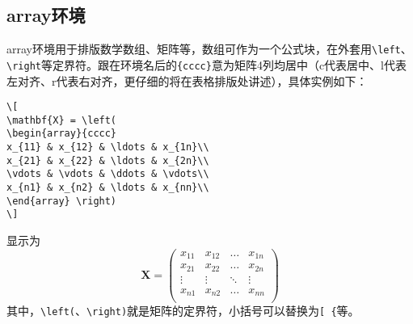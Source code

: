 \subsection{array环境}
array环境用于排版数学数组、矩阵等，数组可作为一个公式块，在外套用\verb|\left|、\verb|\right|等定界符。跟在环境名后的\verb|{cccc}|意为矩阵4列均居中（c代表居中、l代表左对齐、r代表右对齐，更仔细的将在表格排版处讲述），具体实例如下：
\begin{verbatim}
\[ 
\mathbf{X} = \left(
\begin{array}{cccc}
x_{11} & x_{12} & \ldots & x_{1n}\\
x_{21} & x_{22} & \ldots & x_{2n}\\
\vdots & \vdots & \ddots & \vdots\\
x_{n1} & x_{n2} & \ldots & x_{nn}\\
\end{array} \right) 
\]
\end{verbatim}
显示为
\[ 
\mathbf{X} = \left(
\begin{array}{cccc}
x_{11} & x_{12} & \ldots & x_{1n}\\
x_{21} & x_{22} & \ldots & x_{2n}\\
\vdots & \vdots & \ddots & \vdots\\
x_{n1} & x_{n2} & \ldots & x_{nn}\\
\end{array} \right) 
\]
其中，\verb|\left(|、\verb|\right)|就是矩阵的定界符，小括号可以替换为\verb|[ {|等。
